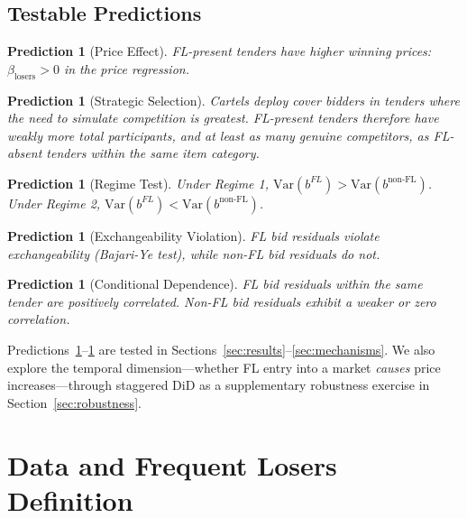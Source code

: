 \documentclass[12pt]{elsarticle}
\newtheorem{prediction}[theorem]{Prediction}
\begin{document}
\subsection{Testable Predictions}

\begin{prediction}[Price Effect]
\label{pred:price}
FL-present tenders have higher winning prices: $\beta_{\text{losers}} > 0$ in the price regression.
\end{prediction}

\begin{prediction}[Strategic Selection]
\label{pred:selection}
Cartels deploy cover bidders in tenders where the need to simulate competition is greatest. FL-present tenders therefore have weakly more total participants, and at least as many genuine competitors, as FL-absent tenders within the same item category.
\end{prediction}

\begin{prediction}[Regime Test]
\label{pred:regime}
Under Regime 1, $\text{Var}(b^{FL}) > \text{Var}(b^{\text{non-FL}})$. Under Regime 2, $\text{Var}(b^{FL}) < \text{Var}(b^{\text{non-FL}})$.
\end{prediction}

\begin{prediction}[Exchangeability Violation]
\label{pred:exchange}
FL bid residuals violate exchangeability (Bajari-Ye test), while non-FL bid residuals do not.
\end{prediction}

\begin{prediction}[Conditional Dependence]
\label{pred:independence}
FL bid residuals within the same tender are positively correlated. Non-FL bid residuals exhibit a weaker or zero correlation.
\end{prediction}

Predictions~\ref{pred:price}--\ref{pred:independence} are tested in Sections~\ref{sec:results}--\ref{sec:mechanisms}. We also explore the temporal dimension---whether FL entry into a market \textit{causes} price increases---through staggered DiD as a supplementary robustness exercise in Section~\ref{sec:robustness}.

\section{Data and Frequent Losers Definition}
\label{sec:data}
\end{document}
